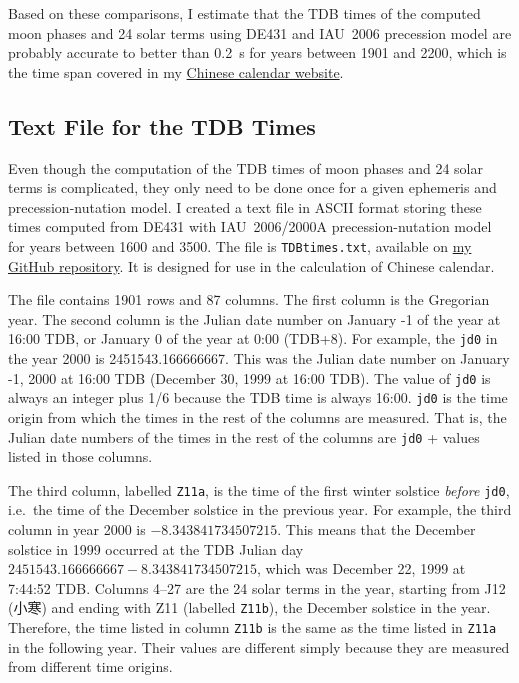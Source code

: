 \documentclass[12pt]{article}
\begin{document}
\begin{CJK}{UTF8}{bkai}
Based on these comparisons, I estimate that the TDB times of the computed moon 
phases and 24 solar terms using DE431 and IAU~2006 precession model are 
probably accurate to better than 0.2~s for years 
between 1901 and 2200, which is the time span covered in my 
\href{../calendar.html}{Chinese calendar website}.

\subsection{Text File for the TDB Times}

Even though the computation of the TDB times of moon phases and 24 solar terms 
is complicated, they only need to be done once for a given ephemeris 
and precession-nutation model. I created a text file in ASCII format 
storing these times computed from DE431 with IAU~2006/2000A precession-nutation 
model for years between 1600 and 3500. The file is {\tt TDBtimes.txt}, available 
on \href{https://github.com/ytliu0/ChineseCalendar}{my GitHub repository}. 
It is designed for use in the calculation of 
Chinese calendar.

The file contains 1901 rows and 87 columns. The first column is the 
Gregorian year. The second column is the Julian date number on 
January -1 of the year at 16:00 TDB, or January 0 of the year at 0:00 (TDB+8). 
For example, the {\tt jd0} in the year 2000 is 2451543.166666667. This was 
the Julian date number on January -1, 2000 at 16:00 TDB (December 30, 1999 at 16:00 TDB). 
The value of {\tt jd0} is always an integer plus 1/6 because the TDB time is always 16:00. 
{\tt jd0} is the time origin from which the times in the rest of the columns are measured. 
That is, the Julian date numbers of the times in the rest of the columns are 
{\tt jd0} + values listed in those columns. 

The third column, labelled {\tt Z11a}, is the time of the first winter solstice 
{\em before} {\tt jd0}, i.e.\ the time of the December solstice in the previous year. 
For example, the third column in year 2000 is $-8.343841734507215$. This means that 
the December solstice in 1999 occurred at the TDB Julian day 
$2451543.166666667-8.343841734507215$, which was December 22, 1999 at 7:44:52 TDB. 
Columns 4--27 are the 24 solar terms in the year, starting from J12 (小寒) and 
ending with Z11 (labelled {\tt Z11b}), the December solstice in the year. 
Therefore, the time listed in column {\tt Z11b} is the same as the time listed 
in {\tt Z11a} in the following year. Their values are different simply because they 
are measured from different time origins.


\end{CJK}
\end{document}
